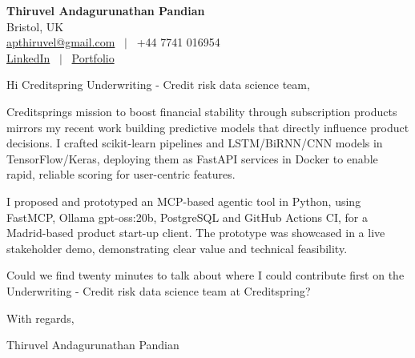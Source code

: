 \documentclass[11pt,a4paper]{article}
\begin{document}
\raggedright
\pagestyle{empty}

\begin{center}
    {\LARGE \color{linkblue} \textbf{Thiruvel Andagurunathan Pandian}}\\[0.2cm]
    Bristol, UK \\
    \href{mailto:apthiruvel@gmail.com}{apthiruvel@gmail.com} \ $|$ \ +44 7741 016954 \\
\href{https://www.linkedin.com/in/thiruvel-a-p/}{LinkedIn} \ $|$ \ \href{https://thiruvel-ap.github.io/PersonalPortfolio/}{Portfolio}
\end{center}

\vspace{0.4cm}

\noindent
Hi Creditspring Underwriting - Credit risk data science team,

Creditspring\textquotesingle{}s mission to boost financial stability through subscription products mirrors my recent work building predictive models that directly influence product decisions. I crafted scikit-learn pipelines and LSTM/BiRNN/CNN models in TensorFlow/Keras, deploying them as FastAPI services in Docker to enable rapid, reliable scoring for user-centric features.

I proposed and prototyped an MCP-based agentic tool in Python, using FastMCP, Ollama gpt-oss:20b, PostgreSQL and GitHub Actions CI, for a Madrid-based product start-up client. The prototype was showcased in a live stakeholder demo, demonstrating clear value and technical feasibility.

Could we find twenty minutes to talk about where I could contribute first on the Underwriting - Credit risk data science team at Creditspring?

\vspace{0.5cm}

With regards,

Thiruvel Andagurunathan Pandian
\end{document}
